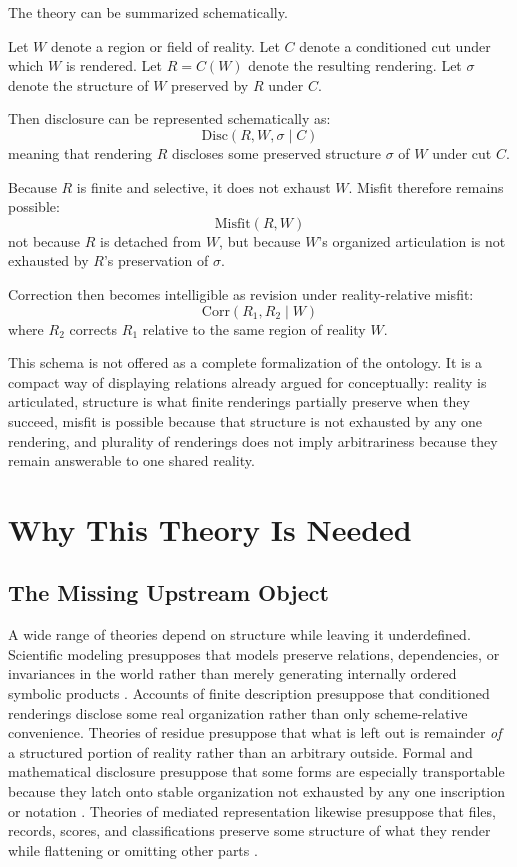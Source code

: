\documentclass[11pt]{article}
\renewcommand{\emph}[1]{\textit{#1}}
\begin{document}
The theory can be summarized schematically.

Let \(W\) denote a region or field of reality. Let \(C\) denote a conditioned cut under which \(W\) is rendered. Let \(R=C(W)\) denote the resulting rendering. Let \(\sigma\) denote the structure of \(W\) preserved by \(R\) under \(C\).

Then disclosure can be represented schematically as:
\[
\mathrm{Disc}(R,W,\sigma \mid C)
\]
meaning that rendering \(R\) discloses some preserved structure \(\sigma\) of \(W\) under cut \(C\).

Because \(R\) is finite and selective, it does not exhaust \(W\). Misfit therefore remains possible:
\[
\mathrm{Misfit}(R,W)
\]
not because \(R\) is detached from \(W\), but because \(W\)'s organized articulation is not exhausted by \(R\)'s preservation of \(\sigma\).

Correction then becomes intelligible as revision under reality-relative misfit:
\[
\mathrm{Corr}(R_1,R_2 \mid W)
\]
where \(R_2\) corrects \(R_1\) relative to the same region of reality \(W\).

This schema is not offered as a complete formalization of the ontology. It is a compact way of displaying relations already argued for conceptually: reality is articulated, structure is what finite renderings partially preserve when they succeed, misfit is possible because that structure is not exhausted by any one rendering, and plurality of renderings does not imply arbitrariness because they remain answerable to one shared reality.
\section{Why This Theory Is Needed}

\subsection{The Missing Upstream Object}

A wide range of theories depend on structure while leaving it underdefined. Scientific modeling presupposes that models preserve relations, dependencies, or invariances in the world rather than merely generating internally ordered symbolic products \cite{FriggHartmann2025ModelsScienceSEP,FriggNguyen2021ScientificRepresentationSEP}. Accounts of finite description presuppose that conditioned renderings disclose some real organization rather than only scheme-relative convenience. Theories of residue presuppose that what is left out is remainder \emph{of} a structured portion of reality rather than an arbitrary outside. Formal and mathematical disclosure presuppose that some forms are especially transportable because they latch onto stable organization not exhausted by any one inscription or notation \cite{Cassirer1953SubstanceFunction,Shapiro2000ThinkingAboutMathematics}. Theories of mediated representation likewise presuppose that files, records, scores, and classifications preserve some structure of what they render while flattening or omitting other parts \cite{BowkerStar1999SortingThingsOut}.
\end{document}
